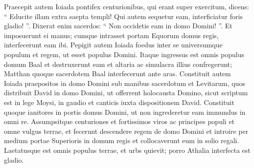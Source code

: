 \begin{biblechapter}
\begin{biblechapter}
\begin{biblechapter}
\begin{biblechapter}
\begin{biblechapter}
\begin{biblechapter}
\begin{biblechapter}
\begin{biblechapter}
\begin{biblechapter}
\begin{biblechapter}
\begin{biblechapter}
\begin{biblechapter}
\begin{biblechapter}
\begin{biblechapter}
\begin{biblechapter}
\begin{biblechapter}
\begin{biblechapter}
\begin{biblechapter}
\begin{biblechapter}
\begin{biblechapter}
\begin{biblechapter}
\begin{biblechapter}
\begin{biblechapter}
 \verse Praecepit autem Ioiada pontifex centurionibus, qui erant super exercitum, dicens: “ Educite illam extra saepta templi! Qui autem sequetur eam, interficiatur foris gladio! ”. Dixerat enim sacerdos: “ Non occidetis eam in domo Domini! ”. 
\verse Et imposuerunt ei manus; cumque intrasset portam Equorum domus regis, interfecerunt eam ibi.
 \verse Pepigit autem Ioiada foedus inter se universumque populum et regem, ut esset populus Domini. 
\verse Itaque ingressus est omnis populus domum Baal et destruxerunt eam et altaria ac simulacra illius confregerunt; Matthan quoque sacerdotem Baal interfecerunt ante aras. 
\verse Constituit autem Ioiada praepositos in domo Domini sub manibus sacerdotum et Levitarum, quos distribuit David in domo Domini, ut offerrent holocausta Domino, sicut scriptum est in lege Moysi, in gaudio et canticis iuxta dispositionem David. 
\verse Constituit quoque ianitores in portis domus Domini, ut non ingrederetur eam immundus in omni re. 
 \verse Assumpsitque centuriones et fortissimos viros ac principes populi et omne vulgus terrae, et fecerunt descendere regem de domo Domini et introire per medium portae Superioris in domum regis et collocaverunt eum in solio regali. 
 \verse Laetatusque est omnis populus terrae, et urbs quievit; porro Athalia interfecta est gladio.
 

\end{biblechapter}
\end{biblechapter}
\end{biblechapter}
\end{biblechapter}
\end{biblechapter}
\end{biblechapter}
\end{biblechapter}
\end{biblechapter}
\end{biblechapter}
\end{biblechapter}
\end{biblechapter}
\end{biblechapter}
\end{biblechapter}
\end{biblechapter}
\end{biblechapter}
\end{biblechapter}
\end{biblechapter}
\end{biblechapter}
\end{biblechapter}
\end{biblechapter}
\end{biblechapter}
\end{biblechapter}
\end{biblechapter}
